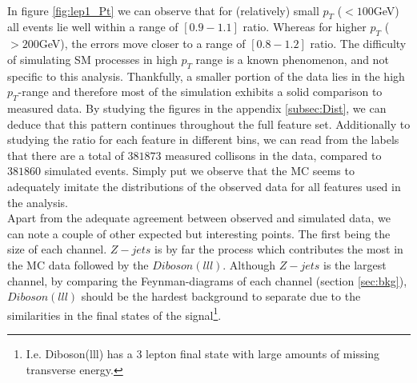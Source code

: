 \\
In figure \ref{fig:lep1_Pt} we can observe that for (relatively) small $p_T$ ($<100$GeV) all events lie well within a range of $[0.9-1.1]$ ratio. 
Whereas for higher $p_T$ ($>200$GeV), the errors move closer to a range of $[0.8-1.2]$ ratio. The difficulty of simulating \ac{SM} processes 
in high $p_T$ range is a known phenomenon, and not specific to this analysis. Thankfully, a smaller portion of the data lies in the high $p_T$-range
and therefore most of the simulation exhibits a solid comparison to measured data. By studying the figures in the appendix \ref{subsec:Dist}, 
we can deduce that this pattern continues throughout the full feature set. Additionally to studying the ratio for each feature in different bins,
we can read from the labels that there are a total of $381873$ measured collisons in the data, compared to $381860$ simulated events.
Simply put we observe that the \ac{MC} seems to adequately imitate the distributions of the observed data for all features used in the analysis. 
\\
Apart from the adequate agreement between observed and simulated data, we can note a couple of other expected
but interesting points. The first being the size of each channel. $Z-jets$ is by far the process which contributes the most in the \ac{MC} data
followed by the $Diboson (lll)$. Although $Z-jets$ is the largest channel, by comparing the Feynman-diagrams of each channel
(section \ref{sec:bkg}), $Diboson(lll)$ should be the hardest background to separate due to the similarities in the 
final states of the signal\footnote{I.e. Diboson(lll) has a 3 lepton final state with large amounts of missing transverse energy.}. 
